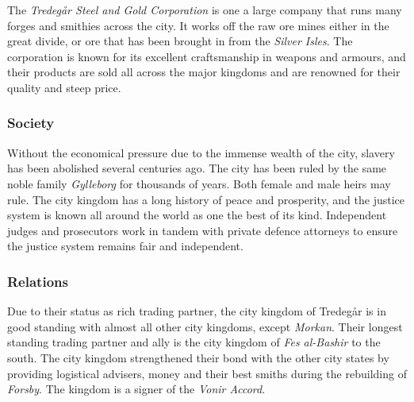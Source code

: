 The \emph{Tredegår Steel and Gold Corporation} is one a large company that
runs many forges and smithies across the city. It works off the raw ore mines
either in the great divide, or ore that has been brought in from the
\emph{Silver Isles}. The corporation is known for its excellent craftsmanship
in weapons and armours, and their products are sold all across the major
kingdoms and are renowned for their quality and steep price.

\subsubsection*{Society}

Without the economical pressure due to the immense wealth of the city, slavery
has been abolished several centuries ago. The city has been ruled by the same
noble family \emph{Gylleborg} for thousands of years. Both female and male
heirs may rule. The city kingdom has a long history of peace and prosperity,
and the justice system is known all around the world as one the best of its
kind. Independent judges and prosecutors work in tandem with private defence
attorneys to ensure the justice system remains fair and independent.

\subsubsection*{Relations}

Due to their status as rich trading partner, the city kingdom of Tredegår is
in good standing with almost all other city kingdoms, except \emph{Morkan}.
Their longest standing trading partner and ally is the city kingdom of
\emph{Fes al-Bashir} to the south. The city kingdom strengthened their bond
with the other city states by providing logistical advisers, money and
their best smiths during the rebuilding of \emph{Forsby}. The kingdom is a
signer of the \emph{Vonir Accord}.
